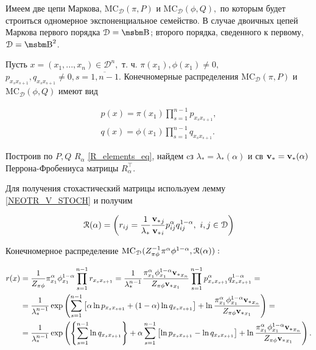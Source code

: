 Имеем две цепи Маркова, $\mathrm{MC}_\mathcal{D}(\pi, P)$ и $\mathrm{MC}_\mathcal{D}(\phi, Q),$ по которым будет строиться одномерное экспоненциальное семейство. В случае двоичных цепей Маркова первого порядка $\mathcal{D} = \B$; второго порядка, сведенного к первому, $\mathcal{D} = \B^2$.

Пусть $x = (x_1, ..., x_n) \in \mathcal{D}^n,$ т. ч. $\pi (x_1), \phi(x_1) \neq 0,$ $p_{x_s x_{s+1}}, q_{x_s x_{s+1}} \neq 0,  s = \overline{1, n-1}.$ Конечномерные распределения $\mathrm{MC}_\mathcal{D}(\pi, P)$ и $\mathrm{MC}_\mathcal{D}(\phi, Q)$ имеют вид 

\begin{align}
p(x) = \pi (x_1) \prod_{s=1}^{n-1} p_{x_s x_{s+1}},\\
q(x) = \phi (x_1) \prod_{s=1}^{n-1} q_{x_s x_{s+1}}. 
\end{align}

Построив по $P, Q$ $R_\alpha$ \eqref{R_elements_eq}, найдем cз $\lambda_\ast = \lambda_\ast (\alpha)$ и св ${\mathbf{v}_\ast} = {\mathbf{v}_\ast}(\alpha)$ Перрона-Фробениуса матрицы $R_\alpha^{\top}.$

Для получения стохастический матрицы используем лемму \ref{NEOTR_V_STOCH} и получим 

\begin{equation}
\label{EXP_FAM}
\mathcal{R} (\al) = \left(r_{ij} = \frac{1}{\lambda_\ast} \frac{{\ev}_j}{{\ev}_i} p_{ij}^\alpha q_{ij}^{1-\alpha}, \ i,j \in \mathcal{D} \right)
\end{equation}

Конечномерное распределение $\mathrm{MC}_\mathcal{D}(Z_{\pi\phi}^{-1} \pi^\alpha \phi^{1 - \alpha}, \mathcal{R}(\alpha)):$  

\begin{align}
r(x) & = \frac{1}{Z_{\pi\phi}} \pi_{x_1}^\alpha \phi_{x_1}^{1 - \alpha}  \prod_{s=1}^{n-1} r_{x_s x_{s+1}} = \frac{1}{\lambda_\ast^{n-1}} \frac{\pi_{x_1}^\alpha \phi_{x_1}^{1 - \alpha} {{\mathbf{v}_\ast}}_{x_n}}{Z_{\pi\phi} {{\mathbf{v}_\ast}}_{x_1}} \prod_{s=1}^{n-1} p_{x_s x_{s+1}}^\alpha q^{1 - \alpha}_{x_s x_{s+1}} = \nonumber \\ 
 & = \frac{1}{\lambda_\ast^{n-1}} \exp \left(\sum_{s=1}^{n-1} \left[ \alpha \ln p_{x_s x_{s+1}} + ({1 - \alpha}) \ln q_{x_s x_{s+1}} \right] + \ln \frac{\pi_{x_1}^\alpha \phi_{x_1}^{1 - \alpha} {{\mathbf{v}_\ast}}_{x_n}}{Z_{\pi\phi} {{\mathbf{v}_\ast}}_{x_1}}  \right) = \nonumber \\
 & = \frac{1}{\lambda_\ast^{n-1}} \exp \left( \left\lbrace \sum_{s=1}^{n-1} \ln q_{x_s x_{s+1}} \right\rbrace + \alpha \sum_{s=1}^{n-1} \left[ \ln p_{x_s x_{s+1}} - \ln q_{x_s x_{s+1}} \right] + \ln \frac{\pi_{x_1}^\alpha \phi_{x_1}^{1 - \alpha} {{\mathbf{v}_\ast}}_{x_n}}{Z_{\pi\phi} {{\mathbf{v}_\ast}}_{x_1}}  \right). 
\end{align}

